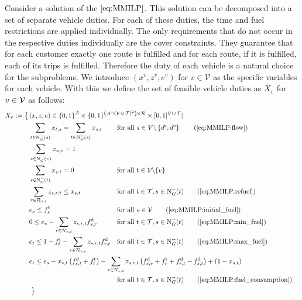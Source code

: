 Consider a solution of the $\eqref{eq:MMILP}$. This solution can be decomposed into a set of separate vehicle duties. For each of these duties, the time and fuel restrictions are applied individually. The only requirements that do not occur in the respective duties individually are the cover constraints. They guarantee that for each customer exactly one route is fulfilled and for each route, if it is fulfilled, each of its trips is fulfilled. Therefore the duty of each vehicle is a natural choice for the subproblems. We introduce $\left(x^v,z^v,e^v\right)$ for $v\in\mathcal{V}$ as the specific variables for each vehicle. With this we define the set of feasible vehicle duties as $X_v$ for $v\in\mathcal{V}$ as follows: 
\begin{align}
	X_v := \left\{\vphantom{\{0,1\}^A}\right. & \omit\rlap{$\displaystyle{(x,z,e)\in\left\{0,1\right\}^A \times \{0,1\}^{\left(A\cap\left(\mathcal{V}\cupdot\mathcal{T}\right)^2\right)\times\mathcal{R}} \times [0,1]^{\mathcal{V}\cupdot\mathcal{T}}|}$} \nonumber \\
	& \sum_{t\in\Nin(s)} x_{t,s} = \sum_{t\in\Nout(s)} x_{s,t} && \text{for all } s\in V\backslash\left\{d^{\operatorname{s}},d^{\operatorname{e}}\right\} \tag{\ref{eq:MMILP:flow}} \\
	& \sum_{s\in\Nin(v)} x_{s,v} = 1 \label{eq:Xv:vehicle} \\
	& \sum_{s\in\Nin(t)} x_{s,t} = 0 && \text{for all } t\in\mathcal{V}\backslash\{v\} \label{eq:Xv:other_vehicles} \\
	& \sum_{r\in\Rst} z_{s,r,t} \leq x_{s,t} & & \text{for all } t\in\mathcal{T}, s\in\Nin(t) \tag{\ref{eq:MMILP:refuel}} \\
	& e_s \leq f_s^0 & & \text{for all } s\in\mathcal{V} \tag{\ref{eq:MMILP:initial_fuel}} \\
	& 0 \leq e_s - \sum_{r\in\Rst} z_{s,r,t}\fd_{s,r} & & \text{for all } t\in\mathcal{T}, s\in\Nin(t) \tag{\ref{eq:MMILP:min_fuel}} \\
	& e_t \leq 1 - \ft_t - \sum_{r\in\Rst} z_{s,r,t}\fd_{r,t} & & \text{for all } t\in\mathcal{T}, s\in\Nin(t) \tag{\ref{eq:MMILP:max_fuel}} \\
	& \omit\rlap{$\displaystyle{e_t \leq e_s - x_{s,t}\left(f_{s,t}^{\operatorname{d}}+f_t^{\operatorname{t}}\right) - \sum_{r\in\Rst} z_{s,r,t}\left(\fd_{s,r}+\ft_r+\fd_{r,t}-\fd_{s,t}\right) + \left(1-x_{s,t}\right)}$} \nonumber \\
	& & & \text{for all } t\in\mathcal{T}, s\in\Nin(t) \tag{\ref{eq:MMILP:fuel_consumption}} \\
	& \left. \vphantom{\{0,1\}^A} \right\} \nonumber
\end{align}

